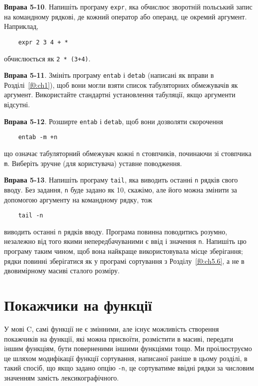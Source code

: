 \documentclass[a4paper,12pt]{book}
\begin{document}
  \textbf{Вправа 5-10}. Напишіть програму \texttt{expr}, яка обчислює зворотній польський
  запис на командному рядкові, де кожний оператор або операнд, це окремий аргумент.
  Наприклад,
  \begin{verbatim}
    expr 2 3 4 + *
  \end{verbatim}
  обчислюється як \texttt{2 * (3+4)}.

  \textbf{Вправа 5-11}. Змініть програму \texttt{entab} і \texttt{detab} (написані як
  вправи в Розділі~\ref{f0:ch1}), щоб вони могли взяти список табуляторних обмежувачів як
  аргумент. Використайте стандартні установлення табуляції, якщо аргументи відсутні.

  \textbf{Вправа 5-12}. Розширте \texttt{entab} і \texttt{detab}, щоб вони дозволяти
  скорочення
  \begin{verbatim}
    entab -m +n
  \end{verbatim}
  що означає табуляторний обмежувач кожні \texttt{n} стовпчиків, починаючи зі стовпчика
  \texttt{m}. Виберіть зручне (для користувача) уставне поводження.

  \textbf{Вправа 5-13}. Напишіть програму \texttt{tail}, яка виводить останні \texttt{n}
  рядків свого вводу. Без задання, \texttt{n} буде задано як 10, скажімо, але його можна
  змінити за допомогою аргументу на командному рядку, тож
  \begin{verbatim}
    tail -n
  \end{verbatim}
  виводить останні \texttt{n} рядків вводу. Програма повинна поводитись розумно, незалежно
  від того якими непередбачуваними є ввід і значення \texttt{n}. Напишіть цю програму
  таким чином, щоб вона найкраще використовувала місце зберігання; рядки повинні
  зберігатися як у програмі сортування з Розділу~\ref{f0:ch5.6}, а не в
  двовимірному масиві сталого розміру.

\section{Покажчики на функції}

\label{f0:ch5.11}
  У мові C, самі функції не є змінними, але існує можливість створення покажчиків
  на функції, які можна присвоїти, розмістити в масиві, передати іншим функціям, бути
  поверненими іншими функціями тощо. Ми проілюструємо це шляхом модифікації функції
  сортування, написаної раніше в цьому розділі, в такий спосіб, що якщо задано опцію
  \texttt{-n}, це сортуватиме ввідні рядки за числовим значенням замість
  лексикографічного.
\end{document}
